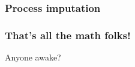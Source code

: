 \documentclass[36pt,handout]{beamer}
\newcommand{\ft}[1]{\frametitle{#1}}
\begin{document}
\begin{frame}
\ft{Process imputation}

\end{frame}

{
\begin{frame}[t]
\frametitle{That's all the math folks!}
Anyone awake?
\vspace*{\fill}
\end{frame}
}
\end{document}
